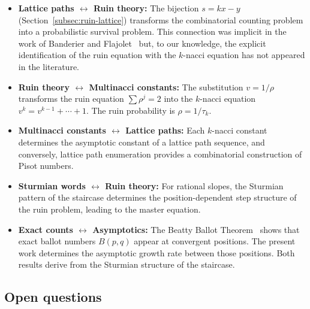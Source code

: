 \documentclass[11pt]{article}
\theoremstyle{definition}
\theoremstyle{remark}
\begin{document}
\begin{itemize}
\item \textbf{Lattice paths $\leftrightarrow$ Ruin theory:}
  The bijection $s = kx - y$ (Section~\ref{subsec:ruin-lattice})
  transforms the combinatorial counting problem into a
  probabilistic survival problem.
  This connection was implicit in the work of Banderier and
  Flajolet~\cite{BanderierFlajolet2002} but, to our knowledge, the
  explicit identification of the ruin equation with the $k$-nacci
  equation has not appeared in the literature.

\item \textbf{Ruin theory $\leftrightarrow$ Multinacci constants:}
  The substitution $v = 1/\rho$ transforms the ruin equation
  $\sum \rho^j = 2$ into the $k$-nacci equation
  $v^k = v^{k-1} + \cdots + 1$.
  The ruin probability is $\rho = 1/\tau_k$.

\item \textbf{Multinacci constants $\leftrightarrow$ Lattice paths:}
  Each $k$-nacci constant determines the asymptotic
  constant of a lattice path sequence, and conversely, lattice path
  enumeration provides a combinatorial construction of Pisot numbers.

\item \textbf{Sturmian words $\leftrightarrow$ Ruin theory:}
  For rational slopes, the Sturmian pattern of the staircase
  determines the position-dependent step structure of the ruin
  problem, leading to the master equation.

\item \textbf{Exact counts $\leftrightarrow$ Asymptotics:}
  The Beatty Ballot Theorem~\cite{PopelkaBeattyBallot2026} shows that
  exact ballot numbers $B(p,q)$ appear at convergent positions.
  The present work determines the asymptotic growth rate between
  those positions.
  Both results derive from the Sturmian structure of the staircase.
\end{itemize}

\subsection{Open questions}
\end{document}
